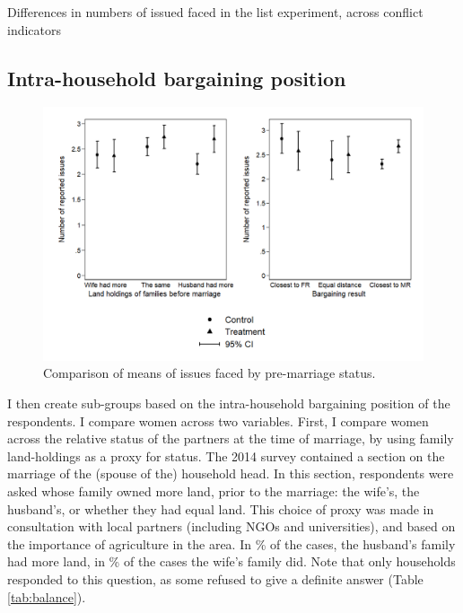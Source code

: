 \begin{table}[htb]
\caption{Differences in numbers of issued faced in the list experiment, across conflict indicators}
\label{tab:meandiff_conf}
\end{table}

\subsection{Intra-household bargaining position}
\begin{figure}[htb]
  \includegraphics[width=\linewidth]{chapters/congogbv/figures/meancompare_mar.png}
  \caption{Comparison of means of issues faced by pre-marriage status.}
  \label{fig:meancompare_mar}
\end{figure}

I then create sub-groups based on the intra-household bargaining position of the respondents. I compare women across two variables. First, I compare women across the relative status of the partners at the time of marriage, by using family land-holdings as a proxy for status. The 2014 survey contained a section on the marriage of the (spouse of the) household head. In this section, respondents were asked whose family owned more land, prior to the marriage: the wife's, the husband's, or whether they had equal land. This choice of proxy was made in consultation with local partners (including NGOs and universities), and based on the importance of agriculture in the area. In \% of the cases, the husband's family had more land, in \% of the cases the wife's family did. Note that only  households responded to this question, as some refused to give a definite answer (Table \ref{tab:balance}). 

